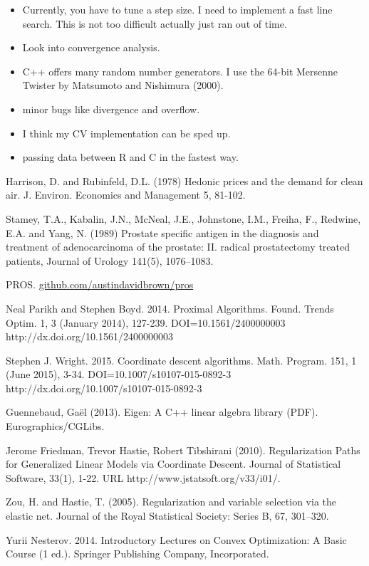 \documentclass[10pt, reqno]{article}
\numberwithin{equation}{section}
\begin{document}
\begin{itemize}

\item Currently, you have to tune a step size. I need to implement a fast line search. This is not too difficult actually just ran out of time.

\item Look into convergence analysis.

\item C++ offers many random number generators. I use the 64-bit Mersenne Twister by Matsumoto and Nishimura (2000).

\item minor bugs like divergence and overflow.

\item I think my CV implementation can be sped up.

\item passing data between R and C in the fastest way.

\end{itemize}

%
%
\newpage
\small
\begin{thebibliography}{1}

Harrison, D. and Rubinfeld, D.L. (1978) Hedonic prices and the
     demand for clean air.  J. Environ. Economics and Management 5,
     81-102.

Stamey, T.A., Kabalin, J.N., McNeal, J.E., Johnstone, I.M., Freiha, F., Redwine, E.A. and Yang, N. (1989)
Prostate specific antigen in the diagnosis and treatment of adenocarcinoma of the prostate: II. radical prostatectomy treated patients, Journal of Urology 141(5), 1076–1083.

PROS. \href{https://github.com/austindavidbrown/pros}{github.com/austindavidbrown/pros}

Neal Parikh and Stephen Boyd. 2014. Proximal Algorithms. Found. Trends Optim. 1, 3 (January 2014), 127-239. DOI=10.1561/2400000003 http://dx.doi.org/10.1561/2400000003

Stephen J. Wright. 2015. Coordinate descent algorithms. Math. Program. 151, 1 (June 2015), 3-34. DOI=10.1007/s10107-015-0892-3 http://dx.doi.org/10.1007/s10107-015-0892-3

Guennebaud, Gaël (2013). Eigen: A C++ linear algebra library (PDF). Eurographics/CGLibs.

Jerome Friedman, Trevor Hastie, Robert Tibshirani (2010). Regularization Paths for Generalized Linear Models via Coordinate Descent. Journal of Statistical Software, 33(1), 1-22. URL http://www.jstatsoft.org/v33/i01/.

Zou, H. and Hastie, T. (2005). Regularization and variable selection via the elastic net. Journal of the Royal Statistical Society: Series B, 67, 301–320.

Yurii Nesterov. 2014. Introductory Lectures on Convex Optimization: A Basic Course (1 ed.). Springer Publishing Company, Incorporated.

\end{thebibliography}
\end{document}
